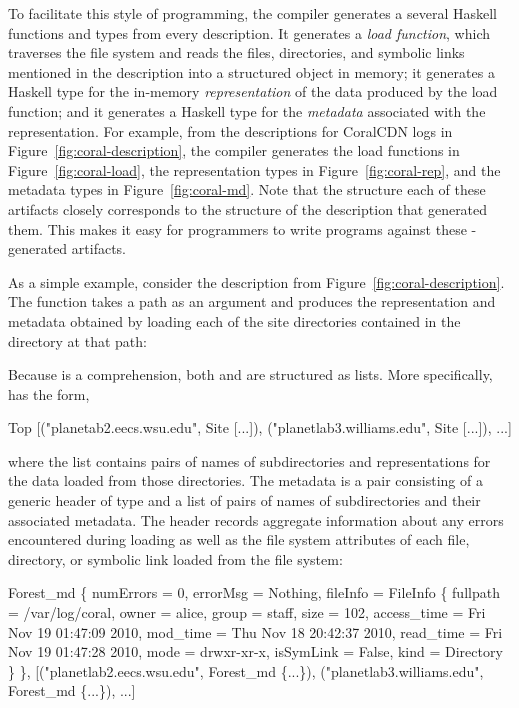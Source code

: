 To facilitate this style of programming, the \forest{} compiler
generates a several Haskell functions and types from every \forest{}
description.  It generates a \emph{load function}, which traverses the
file system and reads the files, directories, and symbolic links
mentioned in the description into a structured object in memory; it
generates a Haskell type for the in-memory \emph{representation} of
the data produced by the load function; and it generates a Haskell
type for the \emph{metadata} associated with the representation. For
example, from the descriptions for CoralCDN logs in
Figure~\ref{fig:coral-description}, the compiler generates the load
functions in Figure~\ref{fig:coral-load}, the representation types in
Figure~\ref{fig:coral-rep}, and the metadata types in
Figure~\ref{fig:coral-md}. Note that the structure each of these
artifacts closely corresponds to the structure of the \forest{}
description that generated them. This makes it easy for programmers to
write programs against these \forest{}-generated artifacts.

As a simple example, consider the  description from
Figure~\ref{fig:coral-description}. The  function takes
a path as an argument and produces the representation and metadata
obtained by loading each of the site directories contained in the
directory at that path:
%
Because  is a comprehension, both  and  are
structured as lists. More specifically,  has the form,
\begin{code}
Top [("planetab2.eecs.wsu.edu", Site [...]),
     ("planetlab3.williams.edu", Site [...]), ...]
\end{code}
where the list contains pairs of names of subdirectories and
representations for the data loaded from those directories. The
metadata is a pair consisting of a generic header of type
 and a list of pairs of names of subdirectories and
their associated metadata. The header records aggregate information
about any errors encountered during loading as well as the file system
attributes of each file, directory, or symbolic link loaded from the
file system:
%
\begin{code}
Forest_md 
  \{ numErrors = 0, 
    errorMsg = Nothing, 
    fileInfo = FileInfo
      \{ fullpath = /var/log/coral, 
        owner = alice, group = staff, size = 102, 
        access_time = Fri Nov 19 01:47:09 2010, 
        mod_time = Thu Nov 18 20:42:37 2010, 
        read_time = Fri Nov 19 01:47:28 2010, 
        mode = drwxr-xr-x, isSymLink = False, 
        kind = Directory \} \},
[("planetlab2.eecs.wsu.edu", Forest_md \{...\}),
 ("planetlab3.williams.edu", Forest_md \{...\}), ...]
\end{code}
%

